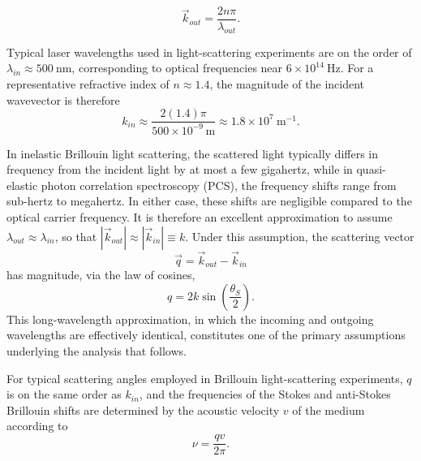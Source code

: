 \begin{equation}
\vec{k}_{out} = \frac{2 n \pi}{\lambda_{out}}.
\end{equation}

Typical laser wavelengths used in light-scattering experiments are on the order of $\lambda_{in} \approx 500~\text{nm}$, corresponding to optical frequencies near $6\times10^{14}~\text{Hz}$. For a representative refractive index of $n \approx 1.4$, the magnitude of the incident wavevector is therefore
\begin{equation}
k_{in} \approx \frac{2(1.4)\pi}{500\times10^{-9}\,\text{m}} \approx 1.8\times10^{7}~\text{m}^{-1}.
\end{equation}

In inelastic Brillouin light scattering, the scattered light typically differs in frequency from the incident light by at most a few gigahertz, while in quasi-elastic photon correlation spectroscopy (PCS), the frequency shifts range from sub-hertz to megahertz. In either case, these shifts are negligible compared to the optical carrier frequency. It is therefore an excellent approximation to assume $\lambda_{out} \approx \lambda_{in}$, so that $|\vec{k}_{out}| \approx |\vec{k}_{in}| \equiv k$. Under this assumption, the scattering vector
\begin{equation}
\vec{q} = \vec{k}_{out} - \vec{k}_{in}
\end{equation}
\noindent has magnitude, via the law of cosines,
\begin{equation}
q = 2k \sin\left(\frac{\theta_S}{2}\right).
\end{equation}
\noindent This long-wavelength approximation, in which the incoming and outgoing wavelengths are effectively identical, constitutes one of the primary assumptions underlying the analysis that follows.

For typical scattering angles employed in Brillouin light-scattering experiments, $q$ is on the same order as $k_{in}$, and the frequencies of the Stokes and anti-Stokes Brillouin shifts are determined by the acoustic velocity $v$ of the medium according to
\begin{equation}
\nu = \frac{q v}{2\pi}.
\end{equation}

